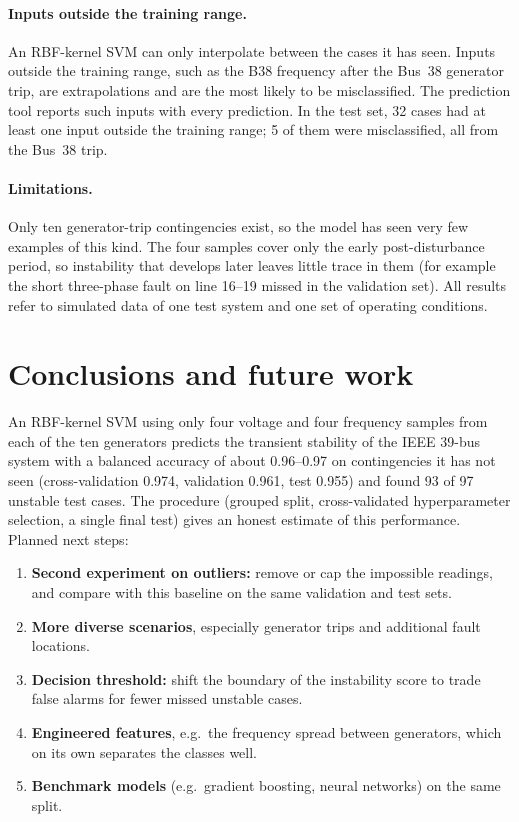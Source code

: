 \documentclass[11pt,a4paper]{article}
\begin{document}
\paragraph{Inputs outside the training range.} An RBF-kernel SVM can only interpolate between the cases it has seen.
Inputs outside the training range, such as the B38 frequency after the Bus~38 generator trip, are extrapolations and
are the most likely to be misclassified. The prediction tool reports such inputs with every prediction. In the test set,
32 cases had at least one input outside the training range; 5 of them were misclassified, all from the Bus~38 trip.

\paragraph{Limitations.} Only ten generator-trip contingencies exist, so the model has seen very few examples of this
kind. The four samples cover only the early post-disturbance period, so instability that develops later leaves little
trace in them (for example the short three-phase fault on line 16--19 missed in the validation set). All results refer
to simulated data of one test system and one set of operating conditions.

\section{Conclusions and future work}
\label{sec:future}
An RBF-kernel SVM using only four voltage and four frequency samples from each of the ten generators predicts the
transient stability of the IEEE 39-bus system with a balanced accuracy of about 0.96--0.97 on contingencies it has not
seen (cross-validation 0.974, validation 0.961, test 0.955) and found 93 of 97 unstable test cases. The procedure
(grouped split, cross-validated hyperparameter selection, a single final test) gives an honest estimate of this
performance. Planned next steps:
\begin{enumerate}
  \item \textbf{Second experiment on outliers:} remove or cap the impossible readings, and compare with this baseline on
        the same validation and test sets.
  \item \textbf{More diverse scenarios}, especially generator trips and additional fault locations.
  \item \textbf{Decision threshold:} shift the boundary of the instability score to trade false alarms for fewer missed
        unstable cases.
  \item \textbf{Engineered features}, e.g.\ the frequency spread between generators, which on its own separates the
        classes well.
  \item \textbf{Benchmark models} (e.g.\ gradient boosting, neural networks) on the same split.
\end{enumerate}
\end{document}
